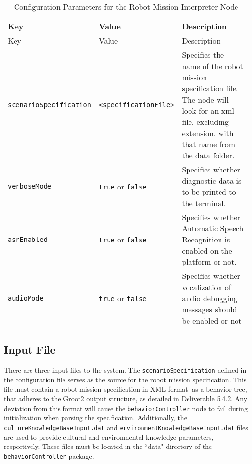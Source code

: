 \documentclass{CSSRforAfrica}
\begin{document}
\begin{longtable}[c]{|l|l|p{6cm}|}
    \caption{Configuration Parameters for the Robot Mission Interpreter Node} \label{tab:config_file}\\
    \hline
    \rowcolor{gray!30}
    \small{\textnormal{Key}} & \small{\textnormal{Value}} & \small{\textnormal{Description}} \\ \hline
    \endfirsthead
    \hline
    \rowcolor{gray!30}
    \small{\textnormal{Key}} & \small{\textnormal{Value}} & \small{\textnormal{Description}} \\ \hline
    \endhead

    \small{\texttt{\small scenarioSpecification}} & \small{\texttt{\small <specificationFile>}} & \small{Specifies the name of the robot mission specification file. The node will look for an xml file, excluding extension, with that name from the data folder.} \\ \hline
    \small{\texttt{\small verboseMode}} & \small{\texttt{\small true} or \texttt{\small false}} & \small{Specifies whether diagnostic data is to be printed to the terminal.} \\ \hline
    \small{\texttt{\small asrEnabled}} & \small{\texttt{\small true} or \texttt{\small false}} & \small{Specifies whether Automatic Speech Recognition is enabled on the platform or not.} \\ \hline
    \small{\texttt{\small audioMode}} & \small{\texttt{\small true} or \texttt{\small false}} & \small{Specifies whether vocalization of audio debugging messages should be enabled or not} \\ \hline
\end{longtable}

\subsection{Input File}
There are three input files to the system. The \texttt{\small scenarioSpecification} defined in the configuration file serves as the source for the robot mission specification. This file must contain a robot mission specification in XML format, as a behavior tree, that adheres to the Groot2 output structure, as detailed in Deliverable 5.4.2. Any deviation from this format will cause the \texttt{\small behaviorController} node to fail during initialization when parsing the specification. Additionally, the 
\\ \texttt{\small cultureKnowledgeBaseInput.dat} and \texttt{\small environmentKnowledgeBaseInput.dat} files are used to provide cultural and environmental knowledge parameters, respectively. These files must be located in the ``data" directory of the \texttt{\small behaviorController} package.
\end{document}
